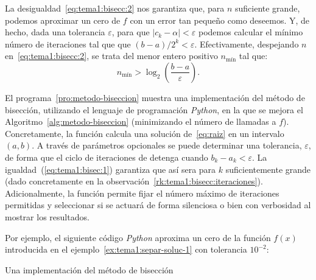 \begin{remark}
  \label{rk:tema1:bisecc:iteraciones}
  La desigualdad~\eqref{eq:tema1:bisecc:2} nos garantiza que, para $n$
  suficiente grande, podemos aproximar un cero de $f$ con un error tan
  pequeño como deseemos. Y, de hecho, dada una tolerancia $\varepsilon$,
  para que $|c_k-\alpha|<\varepsilon$ podemos calcular el mínimo número
  de iteraciones tal que que $(b-a)/2^k < \varepsilon$. Efectivamente,
  despejando $n$ en~\eqref{eq:tema1:bisecc:2}, se trata del menor
  entero positivo $n_{\text{mín}}$ tal que:
  \begin{equation*}
    n_{\text{mín}}>\log_2\left(\frac{b-a}{\varepsilon}\right).
  \end{equation*}
\end{remark}


\begin{test}
  El programa~\ref{pro:metodo-biseccion} muestra una implementación
  del método de bisección, utilizando el lenguaje de programación
  \textit{Python}, en la que se mejora el
  Algoritmo~\ref{alg:metodo-biseccion} (minimizando el número de
  llamadas a $f$). Concretamente, la función
   calcula una solución
  de~\eqref{eq:raiz} en un intervalo $(a,b)$. A través de parámetros
  opcionales se puede determinar una tolerancia, $\varepsilon$, de
  forma que el ciclo de iteraciones de detenga cuando
  $b_k-a_k<\varepsilon$. La igualdad~(\ref{eq:tema1:bisec:1})
  garantiza que así sera para $k$ suficientemente grande (dado
  concretamente en la
  observación~\ref{rk:tema1:bisecc:iteraciones}). Adicionalmente, la
  función permite fijar el número máximo de iteraciones permitidas y
  seleccionar si se actuará de forma silenciosa o bien con
  verbosidad al mostrar los resultados.

  Por ejemplo, el siguiente código \textit{Python} aproxima un cero de
  la función $f(x)$ introducida en el
  ejemplo~\ref{ex:tema1:separ-soluc-1}
  con tolerancia $10^{-2}$:
  \begin{pythonoutput}
  \end{pythonoutput}
\end{test}


\begin{program}
  \label{pro:metodo-biseccion}
  \caption{Una implementación del método de bisección}
\end{program}


